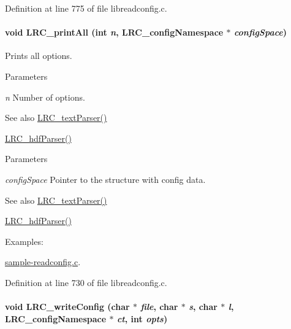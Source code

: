 Definition at line 775 of file libreadconfig.c.\hypertarget{group___l_r_c__wrappers_ga434aa10adcbb1572b06ed29b01187716}{
\paragraph[{LRC\_\-printAll}]{\setlength{\rightskip}{0pt plus 5cm}void LRC\_\-printAll (int {\em n}, \/  {\bf LRC\_\-configNamespace} $\ast$ {\em configSpace})}\hfill}
\label{group___l_r_c__wrappers_ga434aa10adcbb1572b06ed29b01187716}


Prints all options. 
\begin{DoxyParams}{Parameters}
\item[{\em n}]Number of options. \end{DoxyParams}
\begin{DoxySeeAlso}{See also}
\hyperlink{group___l_r_c__parser_ga4b1c98d54591fd4d05cc1caee09cbd35}{LRC\_\-textParser()} 

\hyperlink{group___l_r_c__parser_ga3cbf6e172a98da00ec8fd0b301b4b8f9}{LRC\_\-hdfParser()}
\end{DoxySeeAlso}

\begin{DoxyParams}{Parameters}
\item[{\em configSpace}]Pointer to the structure with config data. \end{DoxyParams}
\begin{DoxySeeAlso}{See also}
\hyperlink{group___l_r_c__parser_ga4b1c98d54591fd4d05cc1caee09cbd35}{LRC\_\-textParser()} 

\hyperlink{group___l_r_c__parser_ga3cbf6e172a98da00ec8fd0b301b4b8f9}{LRC\_\-hdfParser()} 
\end{DoxySeeAlso}
\begin{Desc}
\item[Examples: ]\par
\hyperlink{sample-readconfig_8c-example}{sample-\/readconfig.c}.\end{Desc}


Definition at line 730 of file libreadconfig.c.\hypertarget{group___l_r_c__wrappers_ga51e21668c4d2e0f397b7d20ac8b9cc50}{
\paragraph[{LRC\_\-writeConfig}]{\setlength{\rightskip}{0pt plus 5cm}void LRC\_\-writeConfig (char $\ast$ {\em file}, \/  char $\ast$ {\em s}, \/  char $\ast$ {\em l}, \/  {\bf LRC\_\-configNamespace} $\ast$ {\em ct}, \/  int {\em opts})}\hfill}
\label{group___l_r_c__wrappers_ga51e21668c4d2e0f397b7d20ac8b9cc50}



